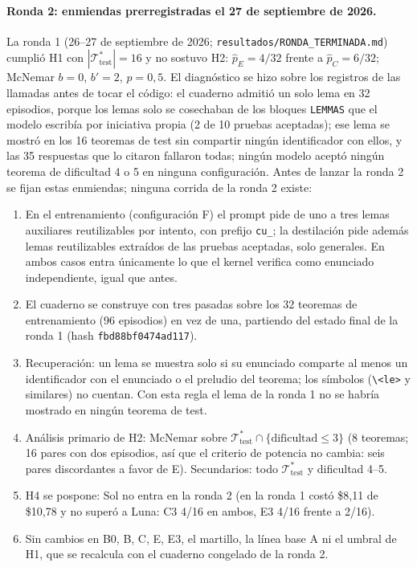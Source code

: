 \documentclass[11pt]{article}
\theoremstyle{remark}
\newcommand{\T}{\mathcal{T}}
\newcommand{\1}{\mathbb{1}}
\begin{document}
\paragraph{Ronda 2: enmiendas prerregistradas el 27 de septiembre de 2026.} La ronda 1 (26--27 de septiembre de 2026; \texttt{resultados/RONDA\_TERMINADA.md}) cumplió H1 con $|\T^*_{\mathrm{test}}|=16$ y no sostuvo H2: $\hat p_E=4/32$ frente a $\hat p_C=6/32$; McNemar $b=0$, $b'=2$, $p=0{,}5$. El diagnóstico se hizo sobre los registros de las llamadas antes de tocar el código: el cuaderno admitió un solo lema en 32 episodios, porque los lemas solo se cosechaban de los bloques \texttt{LEMMAS} que el modelo escribía por iniciativa propia (2 de 10 pruebas aceptadas); ese lema se mostró en los 16 teoremas de test sin compartir ningún identificador con ellos, y las 35 respuestas que lo citaron fallaron todas; ningún modelo aceptó ningún teorema de dificultad 4 o 5 en ninguna configuración. Antes de lanzar la ronda 2 se fijan estas enmiendas; ninguna corrida de la ronda 2 existe:
\begin{enumerate}
\item En el entrenamiento (configuración F) el prompt pide de uno a tres lemas auxiliares reutilizables por intento, con prefijo \texttt{cu\_}; la destilación pide además lemas reutilizables extraídos de las pruebas aceptadas, solo generales. En ambos casos entra únicamente lo que el kernel verifica como enunciado independiente, igual que antes.
\item El cuaderno se construye con tres pasadas sobre los 32 teoremas de entrenamiento (96 episodios) en vez de una, partiendo del estado final de la ronda 1 (hash \texttt{fbd88bf0474ad117}).
\item Recuperación: un lema se muestra solo si su enunciado comparte al menos un identificador con el enunciado o el preludio del teorema; los símbolos (\verb|\<le>| y similares) no cuentan. Con esta regla el lema de la ronda 1 no se habría mostrado en ningún teorema de test.
\item Análisis primario de H2: McNemar sobre $\T^*_{\mathrm{test}}\cap\{\text{dificultad}\le 3\}$ (8 teoremas; 16 pares con dos episodios, así que el criterio de potencia no cambia: seis pares discordantes a favor de E). Secundarios: todo $\T^*_{\mathrm{test}}$ y dificultad 4--5.
\item H4 se pospone: Sol no entra en la ronda 2 (en la ronda 1 costó \$8,11 de \$10,78 y no superó a Luna: C3 4/16 en ambos, E3 4/16 frente a 2/16).
\item Sin cambios en B0, B, C, E, E3, el martillo, la línea base A ni el umbral de H1, que se recalcula con el cuaderno congelado de la ronda 2.
\end{enumerate}
\end{document}
